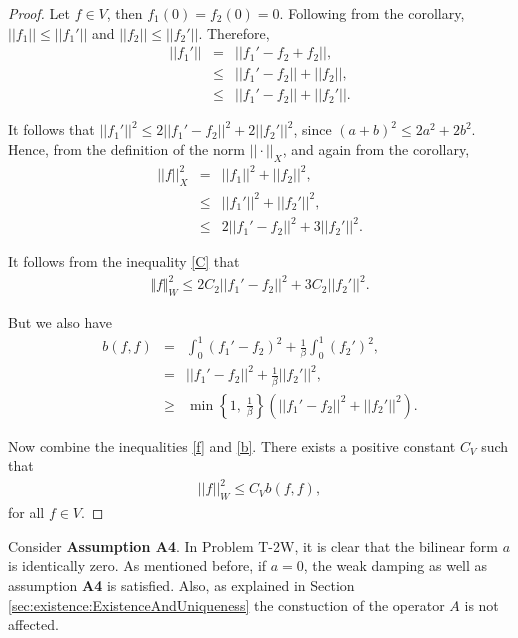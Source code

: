 \documentclass[../../main.tex]{subfiles}
\begin{document}
\begin{proof}
	Let $f \in V$, then $f_1(0) = f_2(0) = 0$. Following from the corollary, $||f_1|| \leq ||f_1'||$ and $||f_2|| \leq ||f_2'||$. Therefore,
	\begin{eqnarray*}
		||f_1'|| & = & ||f_1' - f_2 + f_2||,\\
				 & \leq & ||f_1' - f_2|| + ||f_2||,\\
				 & \leq & ||f_1' - f_2|| + ||f_2'||.
	\end{eqnarray*}

	It follows that $||f_1'||^2 \leq 2||f_1' - f_2||^2 + 2||f_2'||^2$, since $\displaystyle (a+b)^2 \leq 2a^2 + 2b^2$. Hence, from the definition of the norm $||\cdot||_X$, and again from the corollary,
	\begin{eqnarray*}
		||f||_X^2 & = & ||f_1||^2 + ||f_2||^2,\\
				  & \leq & ||f_1'||^2 + ||f_2'||^2,\\
				  & \leq & 2||f_1' - f_2||^2 + 3||f_2'||^2.
	\end{eqnarray*}

	It follows from the inequality \eqref{C} that
	\begin{eqnarray}
		\Vert f \Vert_{W}^2 \leq 2C_2||f_1'-f_2||^2 + 3C_2||f_2'||^2. \label{f}
	\end{eqnarray}

	But we also have
	\begin{eqnarray}
		b(f,f) & = &   \int_0^1 (f_1'-f_2)^2 + \frac{1}{\beta}\int_0^1  (f_2')^2, \nonumber\\
		& = & ||f_1' - f_2||^2 + \frac{1}{\beta}||f_2'||^2, \nonumber\\
		& \geq & \min\left\{1 ,\ \frac{1}{\beta} \right\} \left( ||f_1' - f_2||^2 + ||f_2'||^2\right). \label{b}
	\end{eqnarray}

	Now combine the inequalities \eqref{f} and \eqref{b}. There exists a positive constant $C_V$ such that
	\begin{eqnarray*}
		||f||_W^2 \leq C_V b(f,f),
	\end{eqnarray*} for all $f \in V$.
\end{proof}


Consider \textbf{Assumption A4}. In Problem T-2W, it is clear that the bilinear form $a$ is identically zero. As mentioned before, if $a = 0$, the weak damping as well as assumption \textbf{A4} is satisfied. Also, as explained in Section \ref{sec:existence:ExistenceAndUniqueness} the constuction of the operator $A$ is not affected.
\end{document}

